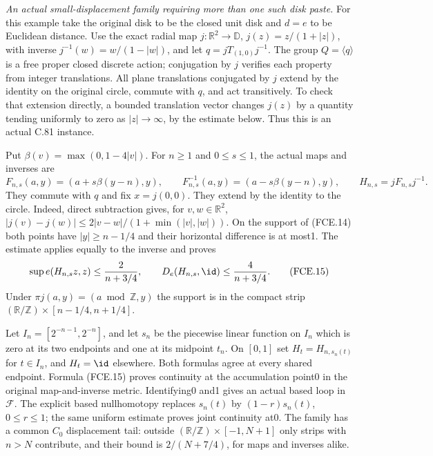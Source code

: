 \emph{An actual small-displacement family requiring more than one such disk paste.}
For this example take the original disk to be the closed
unit disk and $d=e$ to be Euclidean distance. Use the exact
radial map
$j:\mathbb R^2\to\mathbb D$, $j(z)=z/(1+|z|)$, with
inverse $j^{-1}(w)=w/(1-|w|)$, and let
$q=jT_{(1,0)}j^{-1}$. The group $Q=\langle q\rangle$
is a free proper closed discrete action; conjugation by
$j$ verifies each property from integer translations.
All plane translations conjugated by $j$ extend by the
identity on the original circle, commute with $q$, and
act transitively. To check that extension directly, a
bounded translation vector changes $j(z)$ by a quantity
tending uniformly to zero as $|z|\to\infty$, by the
estimate below. Thus this is an actual C.81 instance.

Put $\beta(v)=\max(0,1-4|v|)$. For $n\geq1$ and
$0\leq s\leq1$, the actual maps and inverses are
\[
 F_{n,s}(a,y)=(a+s\beta(y-n),y),\qquad
 F_{n,s}^{-1}(a,y)=(a-s\beta(y-n),y),\qquad
 H_{n,s}=jF_{n,s}j^{-1}.
                                                               \tag{FCE.14}
\]
They commute with $q$ and fix $x=j(0,0)$. They extend by
the identity to the circle. Indeed, direct subtraction
gives, for $v,w\in\mathbb R^2$,
$|j(v)-j(w)|\leq
2|v-w|/(1+\min(|v|,|w|))$.
On the support of (FCE.14) both points have
$|y|\geq n-1/4$ and their horizontal difference is at most1.
The estimate applies equally to the inverse and proves
\[
 \sup e(H_{n,s}z,z)\leq\frac{2}{n+3/4},\qquad
 D_e(H_{n,s},\id)\leq\frac{4}{n+3/4}.
                                                               \tag{FCE.15}
\]
Under $\pi j(a,y)=(a\bmod\mathbb Z,y)$ the support is
in the compact strip
$(\mathbb R/\mathbb Z)\times[n-1/4,n+1/4]$.

Let $I_n=[2^{-n-1},2^{-n}]$, and let $s_n$ be the
piecewise linear function on $I_n$ which is zero at its
two endpoints and one at its midpoint $t_n$.
On $[0,1]$ set $H_t=H_{n,s_n(t)}$ for $t\in I_n$,
and $H_t=\id$ elsewhere. Both formulas agree at every
shared endpoint. Formula (FCE.15) proves continuity at
the accumulation point0 in the original map-and-inverse
metric. Identifying0 and1 gives an actual based loop in
$\mathscr F$. The explicit based nullhomotopy replaces
$s_n(t)$ by $(1-r)s_n(t)$, $0\leq r\leq1$; the same
uniform estimate proves joint continuity at0.
The family has a common $C_0$ displacement tail: outside
$(\mathbb R/\mathbb Z)\times[-1,N+1]$ only strips with
$n>N$ contribute, and their bound is
$2/(N+7/4)$, for maps and inverses alike.

